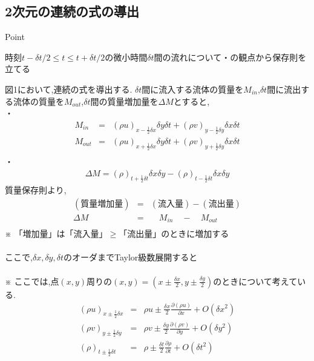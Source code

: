 \documentclass[a4paper]{jsarticle}
\begin{document}
\subsection{2次元の連続の式の導出}
\begin{itembox}[l]{Point}
    \begin{center}
        時刻$t-\delta t/2\leq t \leq t+\delta t/2$の微小時間$\delta t$間の流れについて・の観点から保存則を立てる
    \end{center}
\end{itembox}
図1において,連続の式を導出する.
\noindent$\delta t$間に流入する流体の質量を$M_{in}$,$\delta t$間に流出する流体の質量を$M_{out}$,$\delta t$間の質量増加量を$\Delta M$とすると,\\
・
\begin{eqnarray*}
    M_{in}&=&\left(\rho u\right)_{x-\frac{1}{2}\delta x}\delta y \delta t+\left(\rho v\right)_{y-\frac{1}{2}\delta y}\delta x \delta t\\
    M_{out}&=&\left(\rho u\right)_{x+\frac{1}{2}\delta x}\delta y \delta t+\left(\rho v\right)_{y+\frac{1}{2}\delta y}\delta x \delta t\\
\end{eqnarray*}
\noindent
・
\begin{eqnarray*}
    \Delta M=\left(\rho\right)_{t+\frac{1}{2}\delta t}\delta x \delta y-\left(\rho\right)_{t-\frac{1}{2}\delta t}\delta x \delta y
\end{eqnarray*}
質量保存則より,
\begin{eqnarray*}
    (質量増加量)&=&(流入量)-(流出量)\\
    \Delta M&=&\quad M_{in}\quad -\quad M_{out}\\
\end{eqnarray*}
※ 「増加量」は「流入量」$\geq$「流出量」のときに増加する\\
\\
ここで,$\delta x, \delta y, \delta t$のオーダまでTaylor級数展開すると\\
\\
※ ここでは,点$(x,y)$周りの$\left(x,y\right)=\left(x\pm \frac{\delta x}{2},y\pm \frac{\delta y}{2}\right)$のときについて考えている.
\begin{eqnarray*}
    \left(\rho u\right)_{x\pm \frac{1}{2}\delta x}&=&\rho u\pm \frac{\delta x}{2}\frac{\partial\left(\rho u\right)}{\partial x}+O\left(\delta x^2\right)\\
    \left(\rho v\right)_{y\pm \frac{1}{2}\delta y}&=&\rho v\pm \frac{\delta y}{2}\frac{\partial\left(\rho v\right)}{\partial y}+O\left(\delta y^2\right)\\
    \left(\rho\right)_{t\pm \frac{1}{2}\delta t}&=&\rho \pm \frac{\delta t}{2}\frac{\partial \rho}{\partial t}+O\left(\delta t^2\right)
\end{eqnarray*}
\end{document}
